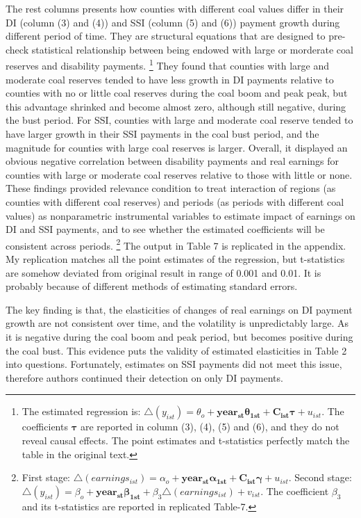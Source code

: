 \documentclass{article} %
\begin{document}
The rest columns presents how counties with different coal values differ in their DI (column (3) and (4)) and SSI (column (5) and (6)) payment growth during different period of time. They are structural equations that are designed to pre-check statistical relationship between being endowed with large or morderate coal reserves and disability payments.
\footnote{The estimated regression is: $\triangle(y_{ist}) = \theta_o + \bm{year_{st} \theta_{1st}} + \bm{C_{ist} \tau} + u_{ist}$. The coefficients $\bm{\tau}$ are reported in column (3), (4), (5) and (6), and they do not reveal causal effects. The point estimates and t-statistics perfectly match the table in the original text.}
They found that counties with large and moderate coal reserves tended to have less growth in DI payments relative to counties with no or little coal reserves during the coal boom and peak peak, but this advantage shrinked and become almost zero, although still negative, during the bust period. For SSI, counties with large and moderate coal reserve tended to have larger growth in their SSI payments in the coal bust period, and the magnitude for counties with large coal reserves is larger. Overall, it displayed an obvious negative correlation between disability payments and real earnings for counties with large or moderate coal reserves relative to those with little or none. 
These findings provided relevance condition to treat interaction of regions (as counties with different coal reserves) and periods (as periods with different coal values) as nonparametric instrumental variables to estimate impact of earnings on DI and SSI payments, and to see whether the estimated coefficients will be consistent across periods. 
\footnote{First stage: $\triangle(earnings_{ist}) = \alpha_o + \bm{year_{st} \alpha_{1st}} + \bm{C_{ist} \gamma} + u_{ist} $. Second stage: $\triangle(y_{ist}) = \beta_o + \bm{year_{st} \beta_{1st}} + \beta_3 \triangle(earnings_{ist}) + v_{ist}$. The coefficient $\beta_3$ and its t-statistics are reported in replicated Table-7. }
The output in Table 7 is replicated in the appendix. My replication matches all the point estimates of the regression, but t-statistics are somehow deviated from original result in range of 0.001 and 0.01. It is probably because of different methods of estimating standard errors.  

The key finding is that, the elasticities of changes of real earnings on DI payment growth are not consistent over time, and the volatility is unpredictably large. As it is negative during the coal boom and peak period, but becomes positive during the coal bust. This evidence puts the validity of estimated elasticities in Table 2 into questions. Fortunately, estimates on SSI payments did not meet this issue, therefore authors continued their detection on only DI payments. 
\end{document}
